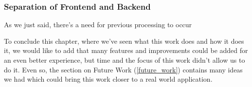 {\subsubsection{Separation of Frontend and Backend}

As we just said, there's a need for previous processing to occur


}









\vspace{2 em}


To conclude this chapter, where we've seen what this work does and how it does it, we would like to add that many features and improvements could be added for an even better experience, but time and the focus of this work didn't allow us to do it. Even so, the section on Future Work (\ref{future_work}) contains many ideas we had which could bring this work closer to a real world application.







